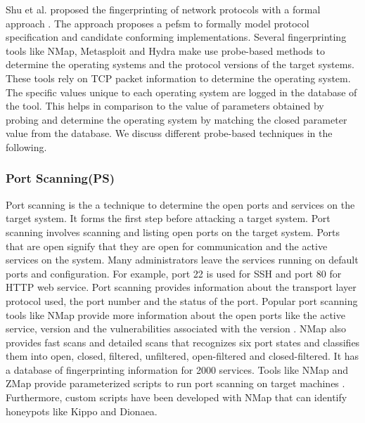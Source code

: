Shu et al.  proposed the fingerprinting of network protocols with a formal approach \cite{shu2006network}. The approach proposes a \acrfull{pefsm} to formally model protocol specification and candidate conforming implementations. Several fingerprinting tools like NMap, Metasploit and Hydra make use probe-based methods to determine the operating systems and the protocol versions of the target systems. These tools rely on TCP packet information to determine the operating system. The specific values unique to each operating system are logged in the database of the tool. This helps in comparison to the value of parameters obtained by probing and determine the operating system by matching the closed parameter value from the database. We discuss different probe-based techniques in the following.

\subsubsection{Port Scanning(PS)}
Port scanning is the a technique to determine the open ports and services on the target system. It forms the first step before attacking a target system. Port scanning involves scanning and listing open ports on the target system. Ports that are open signify that they are open for communication and the active services on the system. Many administrators leave the services running on default ports and configuration. For example, port 22 is used for SSH and port 80 for HTTP web service. Port scanning provides information about the transport layer protocol used, the port number and the status of the port. Popular port scanning tools like NMap provide more information about the open ports like the active service, version and the vulnerabilities associated with the version \cite{NMap}. NMap also provides fast scans and detailed scans that recognizes six port states and classifies them into open, closed, filtered, unfiltered, open-filtered and closed-filtered. It has a database of fingerprinting information for 2000 services. 
Tools like NMap and ZMap provide parameterized scripts to run port scanning on target machines \cite{zmap}. Furthermore, custom scripts have been developed with NMap that can identify honeypots like Kippo and Dionaea.  

